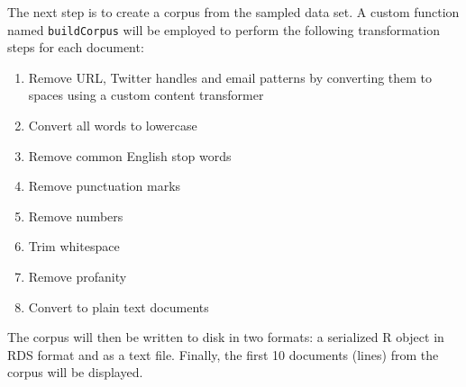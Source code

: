 \documentclass[]{article}
\providecommand{\tightlist}{%
  \setlength{\itemsep}{0pt}\setlength{\parskip}{0pt}}
\begin{document}
The next step is to create a corpus from the sampled data set. A custom
function named \texttt{buildCorpus} will be employed to perform the
following transformation steps for each document:

\begin{enumerate}
\def\labelenumi{\arabic{enumi}.}
\tightlist
\item
  Remove URL, Twitter handles and email patterns by converting them to
  spaces using a custom content transformer
\item
  Convert all words to lowercase
\item
  Remove common English stop words
\item
  Remove punctuation marks
\item
  Remove numbers
\item
  Trim whitespace
\item
  Remove profanity
\item
  Convert to plain text documents
\end{enumerate}

The corpus will then be written to disk in two formats: a serialized R
object in RDS format and as a text file. Finally, the first 10 documents
(lines) from the corpus will be displayed.
\end{document}
